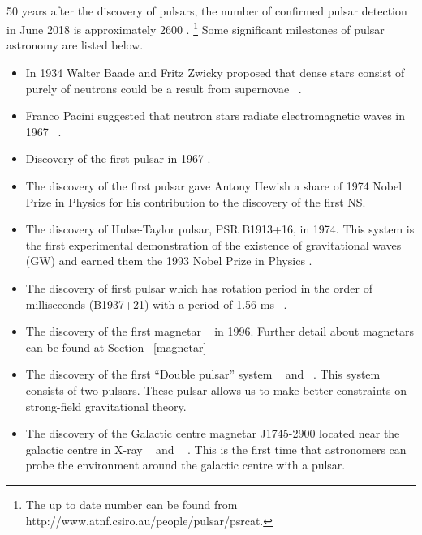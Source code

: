 \documentclass[thesis_msc.tex]{subfiles}
\begin{document}
    \paragraph{} 50 years after the discovery of pulsars, the number of confirmed pulsar detection in June 2018 is approximately 2600 \citep{PSRCAT2}. \footnote{The up to date number can be found from http://www.atnf.csiro.au/people/pulsar/psrcat.} Some significant milestones of pulsar astronomy are listed below.

\begin{itemize}
\item In 1934 Walter Baade and Fritz Zwicky proposed that dense stars consist of purely of neutrons could be a result from supernovae  ~\citep{baade1934remarks}.  

\item Franco Pacini suggested that neutron stars radiate electromagnetic waves in 1967 ~\citep{PACINI1967}. 

\item Discovery of the first pulsar in 1967 \citep{HEWISH1968}.

\item The discovery of the first pulsar gave  Antony Hewish a share of 1974 Nobel Prize in Physics \citep{HEWISH1968} for his contribution to the discovery of the first NS.

\item The discovery of Hulse-Taylor pulsar, PSR B1913+16, in 1974. This system is the first experimental demonstration of the existence of gravitational waves (GW) and earned them the 1993 Nobel Prize in Physics \citep{hulse1975discovery}.

\item The discovery of first pulsar which has rotation period in the order of milliseconds  (B1937+21) with a period of 1.56 ms ~\citep{backer1982millisecond}. 

\item The discovery of the first magnetar ~\citep{kouveliotou1998x} in 1996. Further detail about magnetars can be found at Section ~\ref{magnetar}

\item The discovery of the first ``Double pulsar'' system ~\cite{burgay2003increased} and ~\cite{lyne2004double}. This system consists of two pulsars. These pulsar allows us to make better constraints on strong-field gravitational theory.


\item The discovery of the Galactic centre magnetar J1745-2900 located near the galactic centre in X-ray ~\cite{kennea2013swift} and ~\cite{eatough2013strong} . This is the first time that astronomers can probe the environment around the galactic centre with a pulsar.  

\end{itemize}
\end{document}
